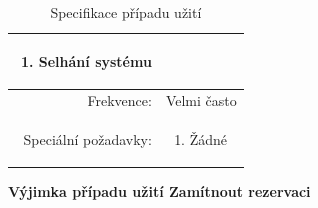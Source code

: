 \documentclass[a4paper,10pt]{article}
\begin{document}
\begin{center}
\begin{table}[ht!]
{\begin{tabular}{| r | p{12cm} |}
\begin{minipage}[t]{0.75\textwidth}
    	\begin{enumerate}[nosep,after=\strut]
    		\item Selhání systému
    	\end{enumerate}
  	\end{minipage} \\
    \hline
    Frekvence: & Velmi často \\
    \hline
    Speciální požadavky: & 
    \begin{minipage}[t]{0.75\textwidth}
    	\begin{enumerate}[nosep,after=\strut]
    		\item Žádné
    	\end{enumerate}
  	\end{minipage} \\
    \hline

\end{tabular}}
\caption{Specifikace případu užití }
\label{table:5}
\end{table}
\end{center}

\newpage
\textbf{Výjimka případu užití \textbf{Zamítnout rezervaci}}
\end{document}
